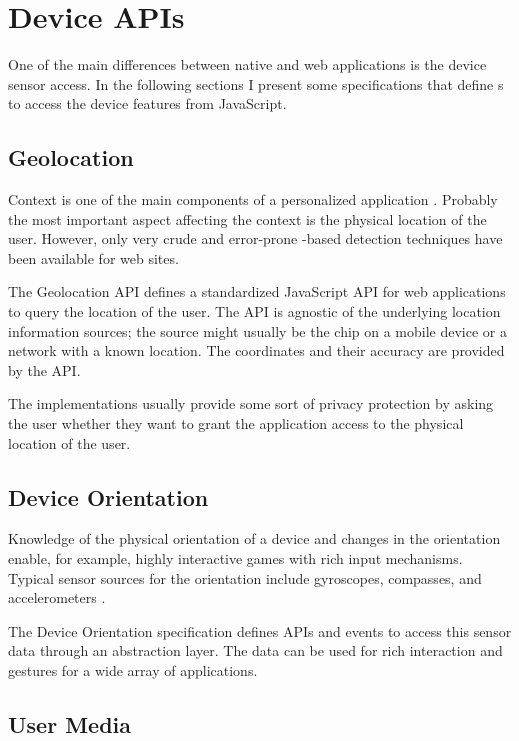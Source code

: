 \section{Device APIs}

One of the main differences between native and web applications is the
device sensor access. In the following sections I present some
specifications that define s to access the device features
from JavaScript.

\subsection{Geolocation}

Context is one of the main components of a personalized application
\cite{fling2009mobile}. Probably the most important aspect affecting
the context is the physical location of the user. However, only very
crude and error-prone -based detection techniques have been
available for web sites.

The Geolocation API defines a standardized JavaScript API for web
applications to query the location of the user. The API is agnostic of
the underlying location information sources; the source might usually
be the  chip on a mobile device or a  network
with a known location. The coordinates and their accuracy are provided
by the API. \cite{geolocationAPI}

The implementations usually provide some sort of privacy protection by
asking the user whether they want to grant the application access to
the physical location of the user.

\subsection{Device Orientation}

Knowledge of the physical orientation of a device and changes in the
orientation enable, for example, highly interactive games with rich
input mechanisms. Typical sensor sources for the orientation include
gyroscopes, compasses, and accelerometers \cite{DeviceOrientation}.

The Device Orientation specification \cite{DeviceOrientation} defines
APIs and events to access this sensor data through an abstraction
layer. The data can be used for rich interaction and gestures for a
wide array of applications.

\subsection{User Media}
\label{section:getusermedia}

